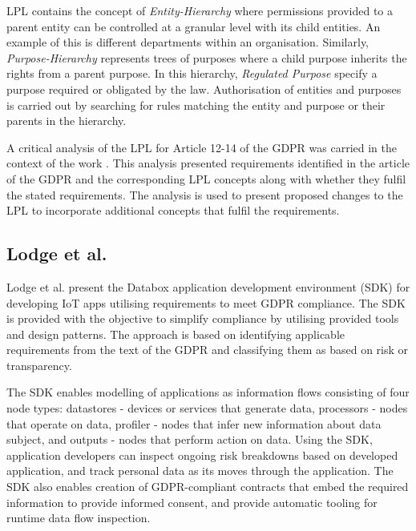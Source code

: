 LPL contains the concept of \textit{Entity-Hierarchy} where permissions provided to a parent entity can be controlled at a granular level with its child entities. An example of this is different departments within an organisation. Similarly, \textit{Purpose-Hierarchy} represents trees of purposes where a child purpose inherits the rights from a parent purpose. In this hierarchy, \textit{Regulated Purpose} specify a purpose required or obligated by the law.
Authorisation of entities and purposes is carried out by searching for rules matching the entity and purpose or their parents in the hierarchy. 

A critical analysis of the LPL for Article 12-14 of the GDPR was carried in the context of the work \cite{gerl_critical_2018}. This analysis presented requirements identified in the article of the GDPR and the corresponding LPL concepts along with whether they fulfil the stated requirements.
The analysis is used to present proposed changes to the LPL to incorporate additional concepts that fulfil the requirements.

\subsection{Lodge et al.}
Lodge et al. \cite{garcia-alfaro_developing_2018} present the Databox application development environment (SDK) for developing IoT apps utilising requirements to meet GDPR compliance. The SDK is provided with the objective to simplify compliance by utilising provided tools and design patterns.
The approach is based on identifying applicable requirements from the text of the GDPR and classifying them as based on risk or transparency.

The SDK enables modelling of applications as information flows consisting of four node types: datastores - devices or services that generate data, processors - nodes that operate on data, profiler - nodes that infer new information about data subject, and outputs - nodes that perform action on data. Using the SDK, application developers can inspect ongoing risk breakdowns based on developed application, and track personal data as its moves through the application. The SDK also enables creation of GDPR-compliant contracts that embed the required information to provide informed consent, and provide automatic tooling for runtime data flow inspection.


